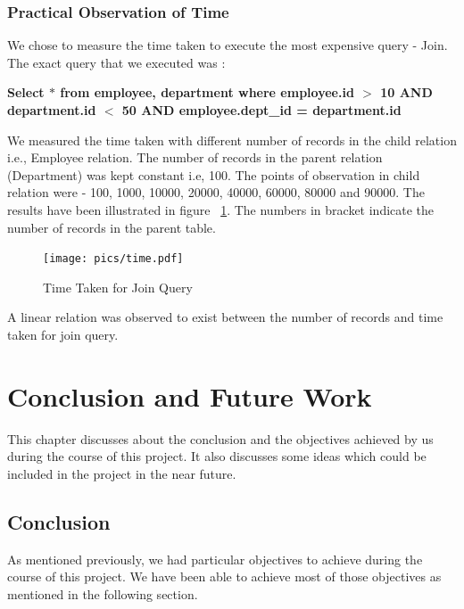 \documentclass[12pt, oneside]{book}
\begin{document}
\subsection{Practical Observation of Time}
We chose to measure the time taken to execute the most expensive query - Join. The exact query that we executed was : \\
\begin{center}
 \textbf{Select $*$ from employee, department where employee.id $>$ 10 AND \\
 department.id $<$ 50 AND employee.dept\_id = department.id}
\end{center}
We measured the time taken with different number of records in the child relation i.e., Employee relation. The number of records in the parent relation (Department) was kept constant i.e, 100. The points of observation in child relation were - 100, 1000, 10000, 20000, 40000, 60000, 80000 and 90000. The results have been illustrated in figure ~\ref{fig:timeresult}. The numbers in bracket indicate the number of records in the parent table. \par
\begin{figure}[ht]
 \centering
 \texttt{[image: pics/time.pdf]}
 \caption{Time Taken for Join Query}
 \label{fig:timeresult}
\end{figure}
A linear relation was observed to exist between the number of records and time taken for join query.


\chapter{Conclusion and Future Work}
This chapter discusses about the conclusion and the objectives achieved by us during the course of this project. It also discusses some ideas which could be included in the project in the near future.   
\section{Conclusion}
As mentioned previously, we had particular objectives to achieve during the course of this project. We have been able to achieve most of those objectives as mentioned in the following section.
\end{document}
